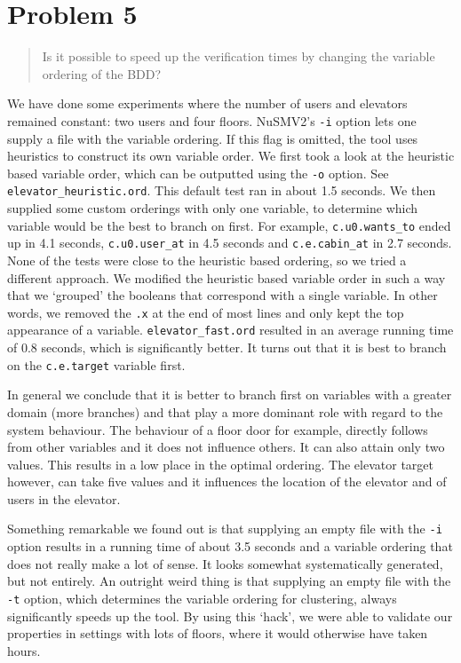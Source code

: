 \documentclass[a4paper,10pt]{article}
\begin{document}
	\section{Problem 5}
	
	\begin{quote}
		Is it possible to speed up the verification times by changing the variable ordering of the BDD?
	\end{quote}
	
	We have done some experiments where the number of users and elevators remained constant: two users and four floors. NuSMV2's \texttt{-i} option lets one supply a file with the variable ordering. If this flag is omitted, the tool uses heuristics to construct its own variable order. We first took a look at the heuristic based variable order, which can be outputted using the \texttt{-o} option. See \texttt{elevator\_heuristic.ord}. This default test ran in about 1.5 seconds. We then supplied some custom orderings with only one variable, to determine which variable would be the best to branch on first. For example, \texttt{c.u0.wants\_to} ended up in 4.1 seconds, \texttt{c.u0.user\_at} in 4.5 seconds and \texttt{c.e.cabin\_at} in 2.7 seconds. None of the tests were close to the heuristic based ordering, so we tried a different approach. We modified the heuristic based variable order in such a way that we `grouped' the booleans that correspond with a single variable. In other words, we removed the \texttt{.x} at the end of most lines and only kept the top appearance of a variable. \texttt{elevator\_fast.ord} resulted in an average running time of 0.8 seconds, which is significantly better. It turns out that it is best to branch on the \texttt{c.e.target} variable first.
	
	In general we conclude that it is better to branch first on variables with a greater domain (more branches) and that play a more dominant role with regard to the system behaviour. The behaviour of a floor door for example, directly follows from other variables and it does not influence others. It can also attain only two values. This results in a low place in the optimal ordering. The elevator target however, can take five values and it influences the location of the elevator and of users in the elevator.
	
	Something remarkable we found out is that supplying an empty file with the \texttt{-i} option results in a running time of about 3.5 seconds and a variable ordering that does not really make a lot of sense. It looks somewhat systematically generated, but not entirely. An outright weird thing is that supplying an empty file with the \texttt{-t} option, which determines the variable ordering for clustering, always significantly speeds up the tool. By using this `hack', we were able to validate our properties in settings with lots of floors, where it would otherwise have taken hours.
	
\end{document}
